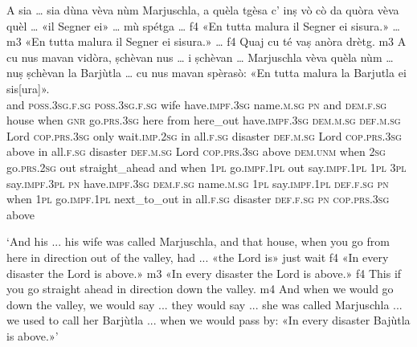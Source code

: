 \begin{linenumbers}
	\gll A sia … sia dùna vèva nùm Marjuschla, a quèla tgèsa c’ inṣ vò cò da quòra vèva quèl … «il Segner ei» … mù spétga … {\ob}f4{\cb} «En tutta malura il Segner ei sisura.»\footnotemark{} … {\ob}m3{\cb} «En tutta malura il Segner ei sisura.» … {\ob}f4{\cb} Quaj cu té vaṣ anòra drètg. {\ob}m3{\cb} A cu nus mavan vidòra, ṣchèvan nus … i ṣchèvan … Marjuschla vèva quèla nùm … nuṣ ṣchèvan la Barjùtla … cu nus mavan spèrasò: «En tutta malura la Barjutla ei sis[ura]».\\
	and \textsc{poss.3sg.f.sg} {} \textsc{poss.3sg.f.sg} wife have.\textsc{impf.3sg} name.\textsc{m.sg} \textsc{pn} and \textsc{dem.f.sg} house when \textsc{gnr} go.\textsc{prs.3sg} here from here\_out have.\textsc{impf.3sg} \textsc{dem.m.sg} {} \textsc{def.m.sg} Lord \textsc{cop.prs.3sg} {} only wait.\textsc{imp.2sg} {} {} in all.\textsc{f.sg} disaster \textsc{def.m.sg} Lord \textsc{cop.prs.3sg} above {} {} in all.\textsc{f.sg} disaster \textsc{def.m.sg} Lord \textsc{cop.prs.3sg} above {} {} \textsc{dem.unm} when \textsc{2sg} go.\textsc{prs.2sg} out straight\_ahead {} and when \textsc{1pl} go.\textsc{impf.1pl} out say.\textsc{impf.1pl} \textsc{1pl} {} \textsc{3pl} say.\textsc{impf.3pl} {} \textsc{pn} have.\textsc{impf.3sg} \textsc{dem.f.sg} name.\textsc{m.sg} {} \textsc{1pl} say.\textsc{impf.1pl} \textsc{def.f.sg} \textsc{pn} {} when \textsc{1pl} go.\textsc{impf.1pl} next\_to\_out in all.\textsc{f.sg} disaster \textsc{def.f.sg} \textsc{pn} \textsc{cop.prs.3sg} above \\
\end{linenumbers}
\medskip
\glt `And his ... his wife was called Marjuschla, and that house, when you go from here in direction out of the valley, had ... «the Lord is» {} just wait {\ob}f4{\cb} «In every disaster the Lord is above.» {\ob}m3{\cb} «In every disaster the Lord is above.» {\ob}f4{\cb} This if you go straight ahead in direction down the valley. {\ob}m4{\cb} And when we would go down the valley, we would say ... they would say ... she was called Marjuschla ... we used to call her Barjùtla ... when we would pass by: «In every disaster Bajùtla is above.»'
\medskip

